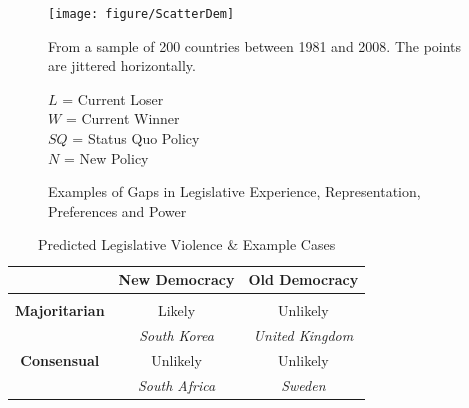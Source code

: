 \documentclass[a4paper]{article}\usepackage{graphicx, color}
\newenvironment{knitrout}{}{} %
\begin{document}
{{\begin{figure}
\begin{center}
\begin{knitrout}
\color{fgcolor}
\texttt{[image: figure/ScatterDem]} 

\end{knitrout}


  \end{center}
    \begin{singlespace}
        {\scriptsize{From a sample of 200 countries between 1981 and 2008. The points are jittered horizontally.}}
    \end{singlespace}
\end{figure}

\begin{figure}[h!]
    \caption{Examples of Gaps in Legislative Experience, Representation, Preferences and Power}
    \label{example_gaps}
    \begin{center}

        

    \end{center}
        \begin{singlespace}
        {\scriptsize{$L$ = Current Loser \\
                        $W$ = Current Winner \\
                        $SQ$ = Status Quo Policy \\
                        $N$ = New Policy
                    }}
    \end{singlespace}

\end{figure}


\begin{table}[!h]
    \begin{center}
    \caption{Predicted Legislative Violence \& Example Cases}
    \label{leg.v.framework}
    \begin{tabular}{c | c c}
        
        & {\bf{New Democracy}} & {\bf{Old Democracy}} \\[0.25cm]
        \hline \\[0.25cm]
        {\bf{Majoritarian}} & Likely & Unlikely \\[0.25cm]
        & {\emph{South Korea}} & {\emph{United Kingdom}} \\[0.5cm]
        {\bf{Consensual}} & Unlikely & Unlikely \\[0.25cm]
         & {\emph{South Africa}} & {\emph{Sweden}} \\[0.25cm]
        \hline


\end{tabular}
\end{center}
\end{table}}}
\end{document}

